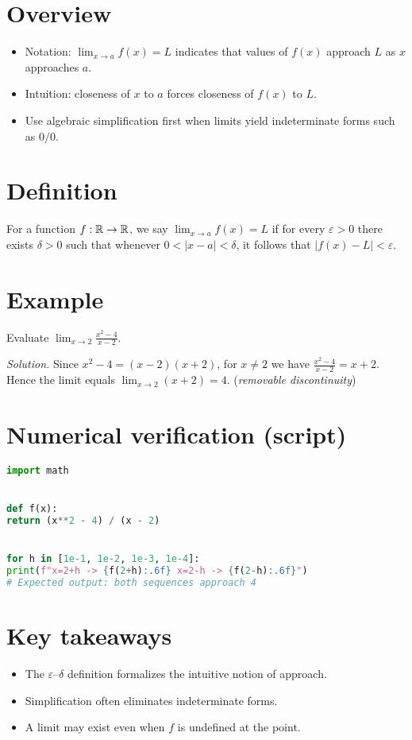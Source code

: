 \documentclass[11pt,a4paper]{article}
\begin{document}

\section*{Overview}
\begin{itemize}
\item Notation: \(\lim_{x\to a} f(x)=L\) indicates that values of \(f(x)\) approach \(L\) as \(x\) approaches \(a\).
\item Intuition: closeness of \(x\) to \(a\) forces closeness of \(f(x)\) to \(L\).
\item Use algebraic simplification first when limits yield indeterminate forms such as \(0/0\).
\end{itemize}


\section*{Definition}
For a function \(f: \mathbb{R}\to\mathbb{R}\), we say \(\lim_{x\to a} f(x)=L\) if for every \(\varepsilon>0\) there exists \(\delta>0\) such that whenever \(0<|x-a|<\delta\), it follows that \(|f(x)-L|<\varepsilon\).


\section*{Example}
Evaluate \(\displaystyle \lim_{x\to 2} \frac{x^2-4}{x-2}.\)


\noindent\textit{Solution.} Since \(x^2-4=(x-2)(x+2)\), for \(x\neq 2\) we have \(\frac{x^2-4}{x-2}=x+2\). Hence the limit equals \(\lim_{x\to 2}(x+2)=4\). \hfill(\emph{removable discontinuity})


\section*{Numerical verification (script)}
\begin{lstlisting}[language=Python, caption={Two-sided evaluation near \(x=2\)}]
import math


def f(x):
return (x**2 - 4) / (x - 2)


for h in [1e-1, 1e-2, 1e-3, 1e-4]:
print(f"x=2+h -> {f(2+h):.6f} x=2-h -> {f(2-h):.6f}")
# Expected output: both sequences approach 4
\end{lstlisting}


\section*{Key takeaways}
\begin{itemize}
\item The \(\varepsilon\)–\(\delta\) definition formalizes the intuitive notion of approach.
\item Simplification often eliminates indeterminate forms.
\item A limit may exist even when \(f\) is undefined at the point.
\end{itemize}
\end{document}
